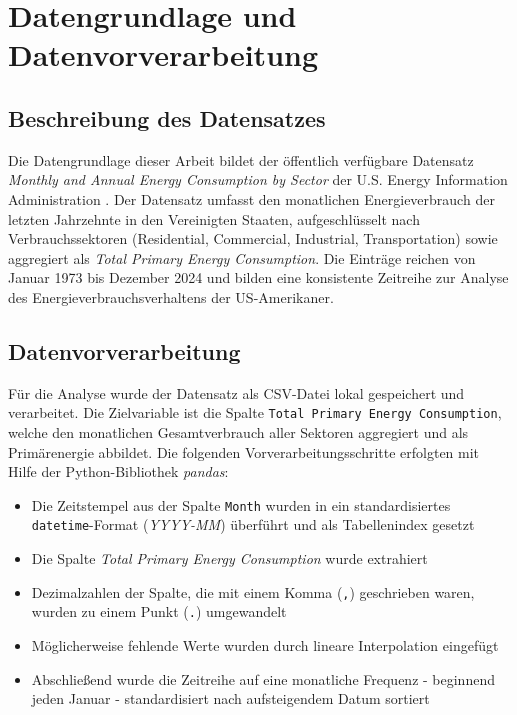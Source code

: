 \newpage

\section{Datengrundlage und Datenvorverarbeitung}
\label{sec:datengrundlage}

\subsection{Beschreibung des Datensatzes}
\label{subsec:datensatz}

Die Datengrundlage dieser Arbeit bildet der öffentlich verfügbare Datensatz \textit{Monthly and Annual Energy Consumption by Sector} der U.S. Energy Information Administration \citeyear{datensatz}. Der Datensatz umfasst den monatlichen Energieverbrauch der letzten Jahrzehnte in den Vereinigten Staaten, aufgeschlüsselt nach Verbrauchssektoren (Residential, Commercial, Industrial, Transportation) sowie aggregiert als \textit{Total Primary Energy Consumption}. Die Einträge reichen von Januar 1973 bis Dezember 2024 und bilden eine konsistente Zeitreihe zur Analyse des Energieverbrauchsverhaltens der US-Amerikaner.

\subsection{Datenvorverarbeitung}
\label{subsec:vorverarbeitung}

Für die Analyse wurde der Datensatz als CSV-Datei lokal gespeichert und verarbeitet. Die Zielvariable ist die Spalte \texttt{Total Primary Energy Consumption}, welche den monatlichen Gesamtverbrauch aller Sektoren aggregiert und als Primärenergie abbildet. Die folgenden Vorverarbeitungsschritte erfolgten mit Hilfe der Python-Bibliothek \textit{pandas}:

\begin{itemize}
    \item Die Zeitstempel aus der Spalte \texttt{Month} wurden in ein standardisiertes \texttt{datetime}-Format (\textit{YYYY-MM}) überführt und als Tabellenindex gesetzt
    \item Die Spalte \textit{Total Primary Energy Consumption} wurde extrahiert
    \item Dezimalzahlen der Spalte, die mit einem Komma (\texttt{,}) geschrieben waren, wurden zu einem Punkt (\texttt{.}) umgewandelt
    \item Möglicherweise fehlende Werte wurden durch lineare Interpolation eingefügt
    \item Abschließend wurde die Zeitreihe auf eine monatliche Frequenz - beginnend jeden Januar - standardisiert nach aufsteigendem Datum sortiert
\end{itemize}

